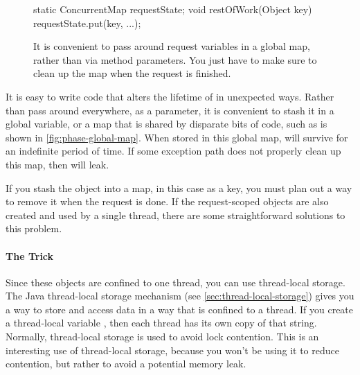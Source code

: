 \begin{figure}
\centering
\begin{framedlisting}
static ConcurrentMap requestState;
void restOfWork(Object key) {
  requestState.put(key, ...);
}
\end{framedlisting}
\caption{It is convenient to pass around request variables in a global map,
rather than via method parameters. You just have to make sure to clean up the
map when the request is finished.}
\label{fig:phase-global-map}
\end{figure}
It is easy to write code that alters the lifetime of  in unexpected
ways. Rather than pass  around everywhere, as a parameter, it is
convenient to stash it in a global variable, or a map that is shared by
disparate bits of code, such as is shown in \autoref{fig:phase-global-map}.
When stored in this global map,  will survive
for an indefinite period of time. If some exception path does not properly clean
up this map, then  will leak.

If you stash the object into a map, in this case as a key, you must plan out a
way to remove it when the  request is done. If the request-scoped
objects are also created and used by a single thread, there are some
straightforward solutions to this problem.

\paragraph{The \TLS Trick}
Since these objects are confined to one thread, you can use thread-local
storage. The Java thread-local storage mechanism (see
\autoref{sec:thread-local-storage}) gives you a way to store and access data in
a way that is confined to a thread. If you create a thread-local variable
, then each thread has its own copy of that string.
Normally, thread-local storage is used to avoid lock contention. This is an
interesting use of thread-local storage, because you won't be using it to reduce
contention, but rather to avoid a potential memory leak.


